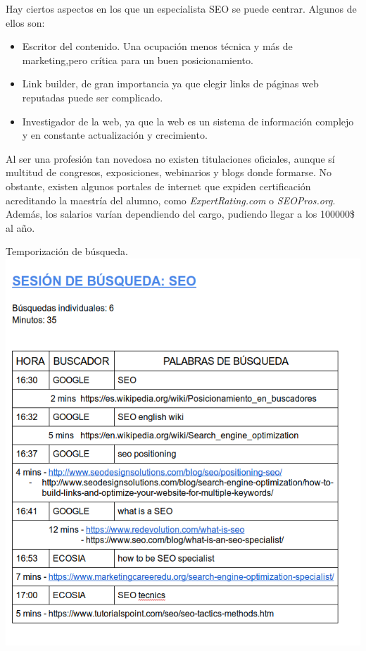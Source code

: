 		Hay ciertos aspectos en los que un especialista SEO se puede centrar. Algunos de ellos son:
		
		\begin{itemize}
			\item Escritor del contenido. Una ocupación menos técnica y más de marketing,pero crítica para un buen posicionamiento.
			\item Link builder, de gran importancia ya que elegir links de páginas web reputadas puede ser complicado.
			\item Investigador de la web, ya que la web es un sistema de información complejo y en constante actualización y crecimiento.
		\end{itemize}
	
		Al ser una profesión tan novedosa no existen titulaciones oficiales, aunque sí multitud de congresos, exposiciones, webinarios y blogs donde formarse. No obstante, existen algunos portales de internet que expiden certificación acreditando la maestría del alumno, como \textit{ExpertRating.com} o \textit{SEOPros.org}. Además, los salarios varían dependiendo del cargo, pudiendo llegar a los 100000\$ al año.
		
		\begin{subsection}{Temporizaci\'on de b\'usqueda.}
			\includegraphics[width=1.2\textwidth]{seo-session.png}
		\end{subsection}
	\newpage
	
